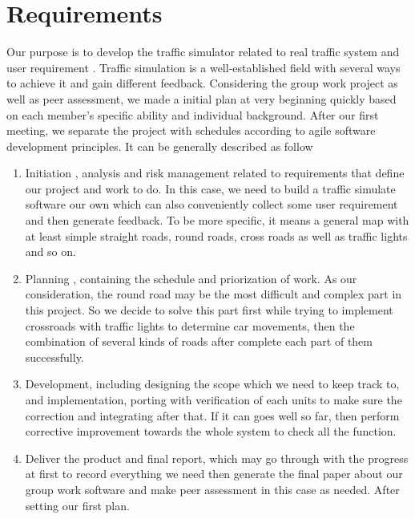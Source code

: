 \documentclass[11pt]{article}
\begin{document}
	\section{Requirements} %
	Our purpose is to develop the traffic simulator related to real traffic system and user requirement . Traffic simulation is a well-established field with several ways to achieve it and gain different feedback.           Considering the group work project as well as peer assessment, we made a initial plan at very beginning quickly based on each member’s specific ability and individual background. After our first meeting, we separate the project with schedules according to agile software development principles. It can be generally described as follow \\
	\begin{enumerate}[noitemsep]
	\item	Initiation , analysis and risk management related to requirements that define our project and work to do.  In this case, we need to build a traffic simulate software our own which can also conveniently collect some user requirement and then generate feedback. To be more specific, it means a general map with at least simple straight roads, round roads, cross roads as well as traffic lights and so on.\\
 \item Planning , containing the schedule and priorization of work.
As our consideration, the round road may be the most difficult and complex part in this project. So we decide to solve this part first while trying to implement crossroads with traffic lights to determine car movements, then the combination of several kinds of roads after complete each part of them successfully. \\ 
\item	Development, including designing the scope which we need to keep track to, and implementation, porting with verification of each units to make sure the correction and integrating after that. If it can goes well so far, then perform corrective improvement towards the whole system to check all the function.\\
\item	Deliver the product and final report, which may go through with the progress at first to record everything we need then generate the final paper about our group work software and make peer assessment in this case as needed.
After setting our first plan.
	\end{enumerate}
\end{document}

